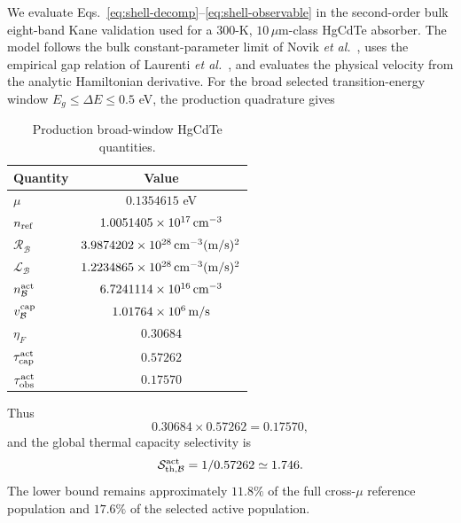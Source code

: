 \documentclass[aps,twocolumn,superscriptaddress,longbibliography]{revtex4-2}
\newcommand{\cB}{\mathcal B}
\newcommand{\cR}{\mathcal R}
\newcommand{\cL}{\mathcal L}
\newcommand{\cS}{\mathcal S}
\begin{document}
We evaluate Eqs.~\eqref{eq:shell-decomp}--\eqref{eq:shell-observable} in the second-order bulk eight-band Kane validation used for a 300-K, $10\,\mu$m-class HgCdTe absorber. The model follows the bulk constant-parameter limit of Novik \textit{et al.}~\cite{Novik2005}, uses the empirical gap relation of Laurenti \textit{et al.}~\cite{Laurenti1990}, and evaluates the physical velocity from the analytic Hamiltonian derivative. For the broad selected transition-energy window $E_g\le\Delta E\le0.5$ eV, the production quadrature gives
\begin{table}[b]
\caption{Production broad-window HgCdTe quantities.}
\label{tab:hgcdte}
\begin{ruledtabular}
\begin{tabular}{lc}
Quantity & Value\\
\hline
$\mu$ & $0.1354615$ eV\\
$n_{\rm ref}$ & $1.0051405\times10^{17}\,{\rm cm}^{-3}$\\
$\cR_{\cB}$ & $3.9874202\times10^{28}\,{\rm cm}^{-3}({\rm m/s})^2$\\
$\cL_{\cB}$ & $1.2234865\times10^{28}\,{\rm cm}^{-3}({\rm m/s})^2$\\
$n_{\cB}^{\rm act}$ & $6.7241114\times10^{16}\,{\rm cm}^{-3}$\\
$v_{\cB}^{\rm cap}$ & $1.01764\times10^6\,{\rm m/s}$\\
$\eta_F$ & $0.30684$\\
$\tau_{\rm cap}^{\rm act}$ & $0.57262$\\
$\tau_{\rm obs}^{\rm act}$ & $0.17570$\\
\end{tabular}
\end{ruledtabular}
\end{table}
Thus
\begin{equation}
0.30684\times0.57262=0.17570,
\end{equation}
and the global thermal capacity selectivity is
\begin{equation}
\cS_{\rm th,\cB}^{\rm act}=1/0.57262\simeq1.746.
\end{equation}
The lower bound remains approximately $11.8\%$ of the full cross-$\mu$ reference population and $17.6\%$ of the selected active population.
\end{document}
